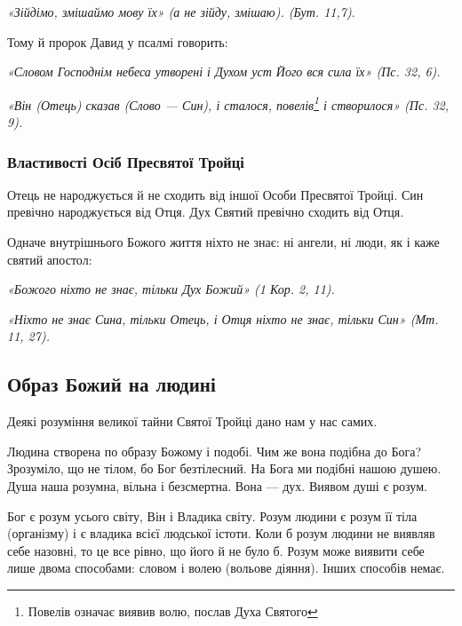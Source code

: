 \documentclass[main.tex]{subfiles}
\begin{document}
\emph{{\color{red} «Зійдімо, змішаймо мову їх»} (а не зійду, змішаю). (Бут. 11,7)}.

Тому й пророк Давид у псалмі говорить:

\begin{FlushRight}
    \emph{«Словом Господнім небеса утворені і Духом уст Його вся сила їх» (Пс. 32, 6).}
\end{FlushRight}

\begin{FlushRight}
  \emph{«Він (Отець) сказав (Слово — Син), і сталося, повелів\footnote{Повелів означає виявив волю, послав Духа Святого} і створилося» (Пс. 32, 9). }  
\end{FlushRight}

\subsubsection{Властивості Осіб Пресвятої Тройці}

Отець не народжується й не сходить від іншої Особи Пресвятої Тройці. Син превічно народжується від Отця. Дух Святий превічно сходить від Отця.
 
Одначе внутрішнього Божого життя ніхто не знає: ні ангели, ні люди, як і каже святий апостол:

\begin{FlushRight}
    \emph{«Божого ніхто не знає, тільки Дух Божий» (1 Кор. 2, 11).}
\end{FlushRight}

\begin{FlushRight}
    \emph{{\color{red} «Ніхто не знає Сина, тільки Отець, і Отця ніхто не знає, тільки Син»} (Мт. 11, 27).}
\end{FlushRight}

\subsection{Образ Божий на людині}

Деякі розуміння великої тайни Святої Тройці дано нам у нас самих.

Людина створена по образу Божому і подобі. Чим же вона подібна до Бога? Зрозуміло, що не тілом, бо Бог безтілесний. На Бога ми подібні нашою душею. Душа наша розумна, вільна і безсмертна. Вона — дух. Виявом душі є розум.

Бог є розум усього світу, Він і Владика світу. Розум людини є розум її тіла (організму) і є владика всієї людської істоти. Коли б розум людини не виявляв себе назовні, то це все рівно, що його й не було б. Розум може виявити себе лише двома способами: словом і волею (вольове діяння). Інших способів немає.
\end{document}
